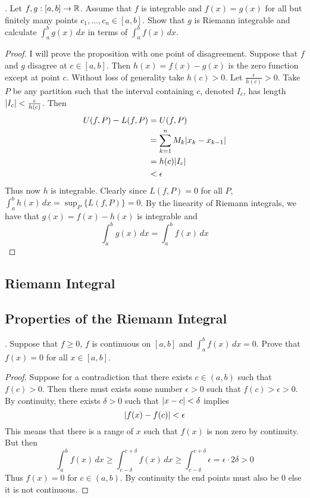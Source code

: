\documentclass[a4paper]{article}
\begin{document}
\begin{qtn}{}{}
\thetcbcounter.\;\; Let $f,g:[a,b]\to\mathbb{R}$. Assume that $f$ is integrable and $f(x)=g(x)$ for all but finitely many points $c_1,\dots,c_n\in[a,b]$. Show that $g$ is Riemann integrable and calculate $\int_a^bg(x)\,dx$ in terms of $\int_a^bf(x)\,dx$. \\\hspace*{\fill}\cite{R0002}\tcbline
\begin{proof}
I will prove the proposition with one point of disagreement. Suppose that $f$ and $g$ disagree at $c\in[a,b]$. Then $h(x)=f(x)-g(x)$ is the zero function except at point $c$. Without loss of generality take $h(c)>0$. Let $\frac{\epsilon}{h(c)}>0$. Take $P$ be any partition such that the interval containing $c$, denoted $I_c$, has length $\abs{I_c}<\frac{\epsilon}{h(c)}$. Then 
\begin{align*}
U(f,P)-L(f,P)&=U(f,P)\\
&=\sum_{k=1}^nM_k\abs{x_k-x_{k-1}}\\
&=h(c)\abs{I_c}\\
&<\epsilon
\end{align*}
Thus now $h$ is integrable. Clearly since $L(f,P)=0$ for all $P$, $\int_a^bh(x)\,dx=\sup_P\{L(f,P)\}=0$. By the linearity of Riemann integrals, we have that $g(x)=f(x)-h(x)$ is integrable and $$\int_a^bg(x)\,dx=\int_a^bf(x)\,dx$$
\end{proof}
\end{qtn}

\subsection{Riemann Integral}


\subsection{Properties of the Riemann Integral}
\begin{qtn}{}{}
\thetcbcounter.\;\; Suppose that $f\geq 0$, $f$ is continuous on $[a,b]$ and $\int_a^bf(x)\,dx=0$. Prove that $f(x)=0$ for all $x\in[a,b]$. \\\hspace*{\fill}\cite{R0001}\tcbline
\begin{proof}
Suppose for a contradiction that there exists $c\in(a,b)$ such that $f(c)>0$. Then there must exists some number $\epsilon>0$ such that $f(c)>\epsilon>0$. By continuity, there exists $\delta>0$ such that $\abs{x-c}<\delta$ implies $$\abs{f(x)-f(c)}<\epsilon$$ This means that there is a range of $x$ such that $f(x)$ is non zero by continuity. But then $$\int_a^bf(x)\,dx\geq\int_{c-\delta}^{c+\delta}f(x)\,dx\geq\int_{c-\delta}^{c+\delta}\epsilon=\epsilon\cdot 2\delta>0$$ Thus $f(x)=0$ for $c\in(a,b)$. By continuity the end points must also be $0$ else it is not continuous. 
\end{proof}
\end{qtn}
\end{document}
